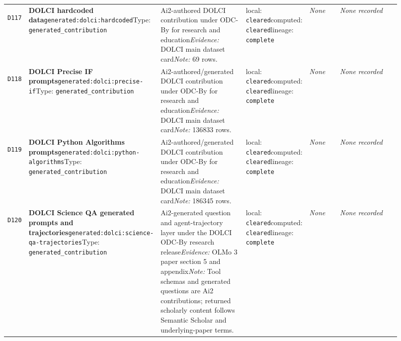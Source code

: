 \documentclass[9pt,a4paper]{article}
\newcommand{\depid}[1]{\hypertarget{dep:#1}{\texttt{#1}}}
\begin{document}
\begin{landscape}
\begin{longtable}{@{}L{0.035\linewidth}L{0.185\linewidth}L{0.27\linewidth}L{0.09\linewidth}L{0.10\linewidth}L{0.24\linewidth}@{}}
\depid{D117} & \textbf{DOLCI hardcoded data}\newline \nolinkurl{generated:dolci:hardcoded}\newline Type: \texttt{generated\_contribution} & Ai2-authored DOLCI contribution under ODC-By for research and education\newline \textit{Evidence:} DOLCI main dataset card\newline \textit{Note:} 69 rows. & local: \texttt{cleared}\newline computed: \texttt{cleared}\newline lineage: \texttt{complete} & \textit{None} & \textit{None recorded} \\
\depid{D118} & \textbf{DOLCI Precise IF prompts}\newline \nolinkurl{generated:dolci:precise-if}\newline Type: \texttt{generated\_contribution} & Ai2-authored/generated DOLCI contribution under ODC-By for research and education\newline \textit{Evidence:} DOLCI main dataset card\newline \textit{Note:} 136833 rows. & local: \texttt{cleared}\newline computed: \texttt{cleared}\newline lineage: \texttt{complete} & \textit{None} & \textit{None recorded} \\
\depid{D119} & \textbf{DOLCI Python Algorithms prompts}\newline \nolinkurl{generated:dolci:python-algorithms}\newline Type: \texttt{generated\_contribution} & Ai2-authored/generated DOLCI contribution under ODC-By for research and education\newline \textit{Evidence:} DOLCI main dataset card\newline \textit{Note:} 186345 rows. & local: \texttt{cleared}\newline computed: \texttt{cleared}\newline lineage: \texttt{complete} & \textit{None} & \textit{None recorded} \\
\depid{D120} & \textbf{DOLCI Science QA generated prompts and trajectories}\newline \nolinkurl{generated:dolci:science-qa-trajectories}\newline Type: \texttt{generated\_contribution} & Ai2-generated question and agent-trajectory layer under the DOLCI ODC-By research release\newline \textit{Evidence:} OLMo 3 paper section 5 and appendix\newline \textit{Note:} Tool schemas and generated questions are Ai2 contributions; returned scholarly content follows Semantic Scholar and underlying-paper terms. & local: \texttt{cleared}\newline computed: \texttt{cleared}\newline lineage: \texttt{complete} & \textit{None} & \textit{None recorded} \\

\end{longtable}
\end{landscape}
\end{document}
